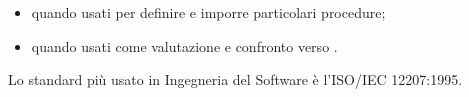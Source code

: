 \begin{itemize}
  \item {} quando usati per definire e imporre
    particolari procedure;
  \item {} quando usati come valutazione e
    confronto verso .
\end{itemize}

Lo standard più usato in Ingegneria del Software è l'ISO/IEC 12207:1995.

